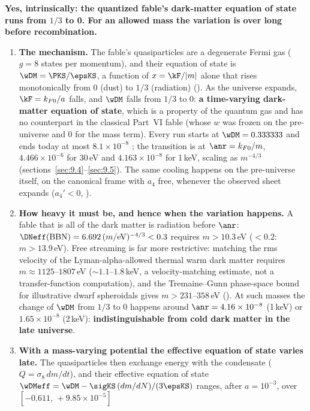 \textbf{Yes, intrinsically: the quantized fable's dark-matter equation of state runs from $1/3$ to 0. For an
allowed mass the variation is over long before recombination.}
\begin{enumerate}
  \item \textbf{The mechanism.} The fable's quasiparticles are a degenerate Fermi gas ($g=8$ states per
        momentum), and their equation of state is $\wDM=\PKS/\epsKS$, a function of $x=\kF/|m|$ alone that rises
        monotonically from 0 (dust) to $1/3$ (radiation) (). As the universe expands,
        $\kF=k_{F0}/a$ falls, and $\wDM$ falls from $1/3$ to 0: \textbf{a time-varying dark-matter equation of
        state}, which is a property of the quantum gas and has no counterpart in the classical Part~VI fable
        (whose $w$ was frozen on the pre-universe and 0 for the mass term). Every run starts at
        $\wDM=0.333333$ and ends today at most $8.1\times10^{-8}$ ; the transition is at
        $\anr=k_{F0}/m$, $4.466\times10^{-6}$ for 30\,eV and $4.163\times10^{-8}$ for 1\,keV, scaling as
        $m^{-4/3}$ (sections~\ref{sec:9.4}--\ref{sec:9.5}). The same cooling happens on the pre-universe itself,
        on the canonical frame with $a_4$ free, whenever the observed sheet expands ($a_4'<0$, ).
  \item \textbf{How heavy it must be, and hence when the variation happens.} A fable that is all of the dark
        matter is radiation before $\anr$: $\DNeff(\mathrm{BBN})=6.692\,(m/\mathrm{eV})^{-4/3}<0.3$ requires
        $m>10.3$\,eV ($<0.2$: $m>13.9$\,eV). Free streaming is far more restrictive: matching the rms velocity of
        the Lyman-alpha-allowed thermal warm dark matter requires $m\approx1125$--$1807$\,eV
        (${\sim}1.1$--$1.8$\,keV, a velocity-matching estimate, not a transfer-function computation), and the
        Tremaine--Gunn phase-space bound for illustrative dwarf spheroidals gives $m>231$--$358$\,eV
        (). At such masses the change of $\wDM$ from $1/3$ to 0 happens around
        $\anr=4.16\times10^{-8}$ (1\,keV) or $1.65\times10^{-8}$ (2\,keV): \textbf{indistinguishable from cold dark
        matter in the late universe}.
  \item \textbf{With a mass-varying potential the effective equation of state varies late.} The quasiparticles
        then exchange energy with the condensate ($Q=\sigma_8\,dm/dt$), and their effective equation of state
        $\wDMeff=\wDM-\sigKS\,(dm/dN)/(3\epsKS)$ ranges, after $a=10^{-3}$, over $[-0.611,\,+9.85\times10^{-5}]$

\end{enumerate}
